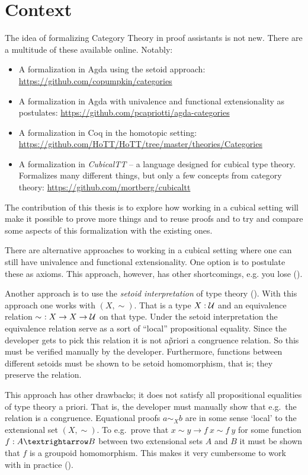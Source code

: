 \section{Context}
\label{sec:context}
%
The idea of formalizing Category Theory in proof assistants is not new. There
are a multitude of these available online. Notably:
%
\begin{itemize}
\item
  A formalization in Agda using the setoid approach:
  \url{https://github.com/copumpkin/categories}
\item
  A formalization in Agda with univalence and functional
  extensionality as postulates:
  \url{https://github.com/pcapriotti/agda-categories}
\item
  A formalization in Coq in the homotopic setting:
  \url{https://github.com/HoTT/HoTT/tree/master/theories/Categories}
\item
  A formalization in \emph{CubicalTT} -- a language designed for
  cubical type theory. Formalizes many different things, but only a
  few concepts from category theory:
  \url{https://github.com/mortberg/cubicaltt}
\end{itemize}
%
The contribution of this thesis is to explore how working in a cubical setting
will make it possible to prove more things and to reuse proofs and to try and
compare some aspects of this formalization with the existing ones.

There are alternative approaches to working in a cubical setting where
one can still have univalence and functional extensionality. One
option is to postulate these as axioms. This approach, however, has
other shortcomings, e.g. you lose 
(\cite[p. 3]{huber-2016}).

Another approach is to use the \emph{setoid interpretation} of type
theory (\cite{hofmann-1995,huber-2016}). With this approach one works
with  $(X, \sim)$. That is a type $X \mathrel{:}
\mathcal{U}$ and an equivalence relation $\sim\ \mathrel{:} X \to X \to \mathcal{U}$ on that
type. Under the setoid interpretation the equivalence relation serve
as a sort of ``local'' propositional equality. Since the developer
gets to pick this relation it is not a\~priori a congruence
relation. So this must be verified manually by the developer.
Furthermore, functions between different setoids must be shown to be
setoid homomorphism, that is; they preserve the relation.

This approach has other drawbacks; it does not satisfy all
propositional equalities of type theory a priori. That is, the
developer must manually show that e.g.\ the relation is a congruence.
Equational proofs $a \sim_{X} b$ are in some sense `local' to the
extensional set $(X , \sim)$. To e.g.\ prove that $x ∼ y → f\ x ∼
f\ y$ for some function $f \tp A → B$ between two extensional sets $A$
and $B$ it must be shown that $f$ is a groupoid homomorphism. This
makes it very cumbersome to work with in practice (\cite[p.
  4]{huber-2016}).

